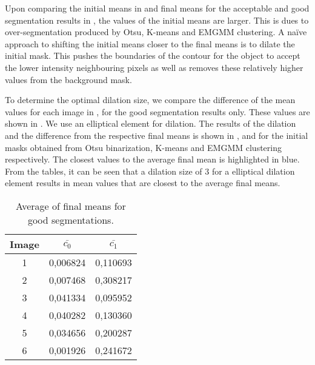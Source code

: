 Upon comparing the initial means in  and final means for the acceptable and good segmentation results in , the values of the initial means are larger. This is dues to over-segmentation produced by Otsu, K-means and EMGMM clustering. A na{\"i}ve approach to shifting the initial means closer to the final means is to dilate the initial mask. This pushes the boundaries of the contour for the object to accept the lower intensity neighbouring pixels as well as removes these relatively higher values from the background mask.

To determine the optimal dilation size, we compare the difference of the mean values for each image in , for the good segmentation results only. These values are shown in . We use an elliptical element for dilation. The results of the dilation and the difference from the respective final means is shown in ,  and  for the initial masks obtained from Otsu binarization, K-means and EMGMM clustering respectively. The closest values to the average final mean is highlighted in blue. From the tables, it can be seen that a dilation size of 3 for a elliptical dilation element results in mean values that are closest to the average final means.

\begin{table}[!h]
	\centering
	\caption{Average of final means for good segmentations.}
	\begin{tabular}{|c|c|c|}
		\hline 
		Image & $\bar{c_0}$ & $\bar{c_1}$ \\ 
		\hline 
		1 & 0,006824 & 0,110693 \\ 
		\hline 
		2 & 0,007468 & 0,308217 \\ 
		\hline 
		3 & 0,041334 & 0,095952 \\ 
		\hline 
		4 & 0,040282 & 0,130360 \\ 
		\hline 
		5 & 0,034656 & 0,200287 \\ 
		\hline 
		6 & 0,001926 & 0,241672 \\ 
		\hline 
	\end{tabular}
	\label{tab:meanofmeans}
\end{table}


